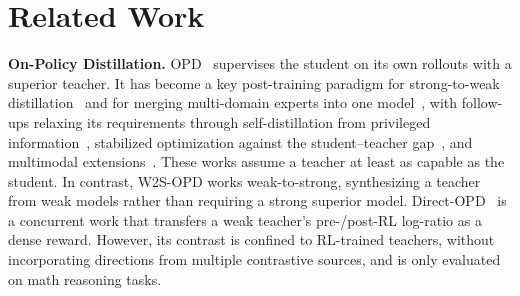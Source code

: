 \documentclass{article}
\newcommand\ours{W2S-OPD\xspace}
\begin{document}
\begin{table}[t]
\centering
\caption{Distribution of the top-1\% highest-$\Delta$ tokens over the eight Schoenfeld episodes. The first
row gives the distribution of each episodes of all tokens.}
\vspace{5pt}
\label{tab:episode-share}

\end{table}


\section{Related Work}
\textbf{On-Policy Distillation.} OPD~\citep{lu2025onpolicydistillation, song2026survey, agarwal2024policy} supervises the student on its own rollouts with a superior teacher. It has become a key post-training paradigm for strong-to-weak distillation~\citep{zeng2026glm, yang2025qwen3} and for merging multi-domain experts into one model~\citep{xiao2026mimo, xu2026deepseek, chen2026counteraction, yang2026oprd}, with follow-ups relaxing its requirements through self-distillation from privileged information~\citep{zhao2026self, shenfeld2026self, hubotter2026reinforcement, ye2026policy}, stabilized optimization against the student--teacher gap~\citep{jin2026entropy, ko2026scaling, xing2026trust, jang2026stable}, and multimodal extensions~\citep{li2026video, liu2026visual, yoon2026decomposed, yuan2026vision, liang2026visual}.
These works assume a teacher at least as capable as the student. In contrast, \ours works weak-to-strong, synthesizing a teacher from weak models rather than requiring a strong superior model. 
Direct-OPD~\citep{feng2026weak} is a concurrent work that transfers a weak teacher's pre-/post-RL log-ratio as a dense reward. However, its contrast is confined to RL-trained teachers, without incorporating directions from multiple contrastive sources, and is only evaluated on math reasoning tasks.
\end{document}
